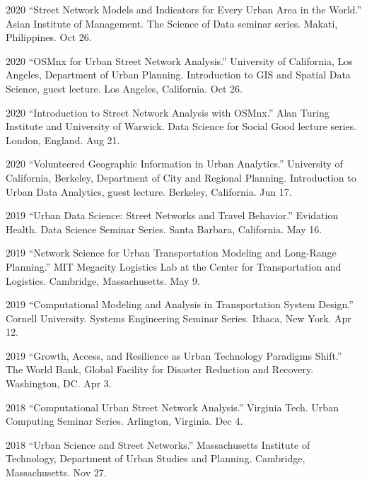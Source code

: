 \documentclass[11pt,letterpaper]{report} %
\begin{document}
\begin{tablist}
        \item[2020] \tab{}\enquote{Street Network Models and Indicators for Every Urban Area in the World.} Asian Institute of Management. The Science of Data seminar series. Makati, Philippines. Oct 26.

        \item[2020] \tab{}\enquote{OSMnx for Urban Street Network Analysis.} University of California, Los Angeles, Department of Urban Planning. Introduction to GIS and Spatial Data Science, guest lecture. Los Angeles, California. Oct 26.

        \item[2020] \tab{}\enquote{Introduction to Street Network Analysis with OSMnx.} Alan Turing Institute and University of Warwick. Data Science for Social Good lecture series. London, England. Aug 21.

        \item[2020] \tab{}\enquote{Volunteered Geographic Information in Urban Analytics.} University of California, Berkeley, Department of City and Regional Planning. Introduction to Urban Data Analytics, guest lecture. Berkeley, California. Jun 17.

        \item[2019] \tab{}\enquote{Urban Data Science: Street Networks and Travel Behavior.} Evidation Health. Data Science Seminar Series. Santa Barbara, California. May 16.

        \item[2019] \tab{}\enquote{Network Science for Urban Transportation Modeling and Long-Range Planning.} MIT Megacity Logistics Lab at the Center for Transportation and Logistics. Cambridge, Massachusetts. May 9.

        \item[2019] \tab{}\enquote{Computational Modeling and Analysis in Transportation System Design.} Cornell University. Systems Engineering Seminar Series. Ithaca, New York. Apr 12.

        \item[2019] \tab{}\enquote{Growth, Access, and Resilience as Urban Technology Paradigms Shift.} The World Bank, Global Facility for Disaster Reduction and Recovery. Washington, DC\@. Apr 3.

        \item[2018] \tab{}\enquote{Computational Urban Street Network Analysis.} Virginia Tech. Urban Computing Seminar Series. Arlington, Virginia. Dec 4.

        \item[2018] \tab{}\enquote{Urban Science and Street Networks.} Massachusetts Institute of Technology, Department of Urban Studies and Planning. Cambridge, Massachusetts. Nov 27.


\end{tablist}
\end{document}

